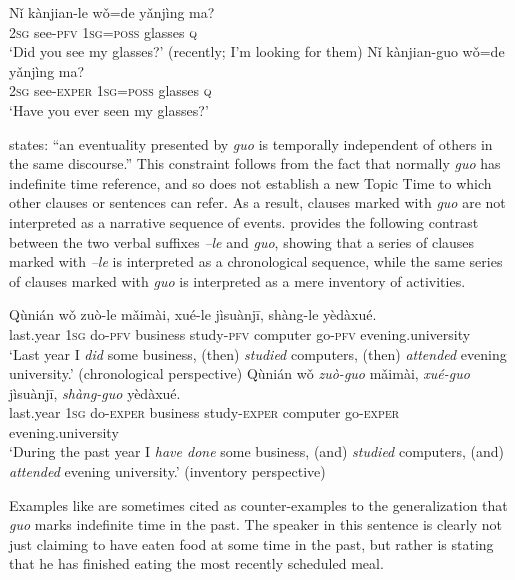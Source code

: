 \ea \label{ex:22.32}
\ea  \gll Nǐ  kànjian-le  wǒ=de  yǎnjìng  ma?\\
\textsc{2sg}  see-\textsc{pfv}  \textsc{1sg}=\textsc{poss}  glasses  \textsc{q}\\
\glt ‘Did you see my glasses?’ (recently; I’m looking for them)
\ex \gll  Nǐ  kànjian-guo  wǒ=de  yǎnjìng  ma?\\
\textsc{2sg}  see-\textsc{exper}  \textsc{1sg}=\textsc{poss}  glasses  \textsc{q}\\
\glt ‘Have you ever seen my glasses?’
\z \z


\citet{Wu2009} states: “an eventuality presented by \textit{guo} is temporally independent of others in the same discourse.” This constraint follows from the fact that normally \textit{guo} has indefinite time reference, and so does not establish a new Topic Time to which other clauses or sentences can refer. As a result, clauses marked with \textit{guo} are not interpreted as a narrative sequence of events. \citet[308]{Iljic1990} provides the following contrast between the two verbal suffixes \textit{–le} and \textit{guo}, showing that a series of clauses marked with \textit{–le} is interpreted as a chronological sequence, while the same series of clauses marked with \textit{guo} is interpreted as a mere inventory of activities.


\ea \label{ex:22.33}

\ea \gll  Qùnián  wǒ  {zuò-le}  mǎimài,  {xué-le}  jìsuànjī,  {shàng-le}  yèdàxué.\\
last.year  \textsc{1sg}  do-\textsc{pfv}  business  study-\textsc{pfv}  computer  go-\textsc{pfv}  evening.university\\
\glt ‘Last year I \textit{did} some business, (then) \textit{studied} computers, (then) \textit{attended} evening university.’ (chronological perspective)
\ex \gll  Qùnián  wǒ  \textit{zuò-guo}  mǎimài,  \textit{xué-guo}  jìsuànjī,  \textit{shàng-guo}  yèdàxué.\\
last.year  \textsc{1sg}  do-\textsc{exper}  business  study-\textsc{exper}  computer  go-\textsc{exper}  evening.university\\
\glt ‘During the past year I \textit{have done} some business, (and) \textit{studied} computers, (and) \textit{attended} evening university.’ (inventory perspective)
\z \z


Examples like  are sometimes cited as counter-examples to the generalization that \textit{guo} marks indefinite time in the past. The speaker in this sentence is clearly not just claiming to have eaten food at some time in the past, but rather is stating that he has finished eating the most recently scheduled meal.


